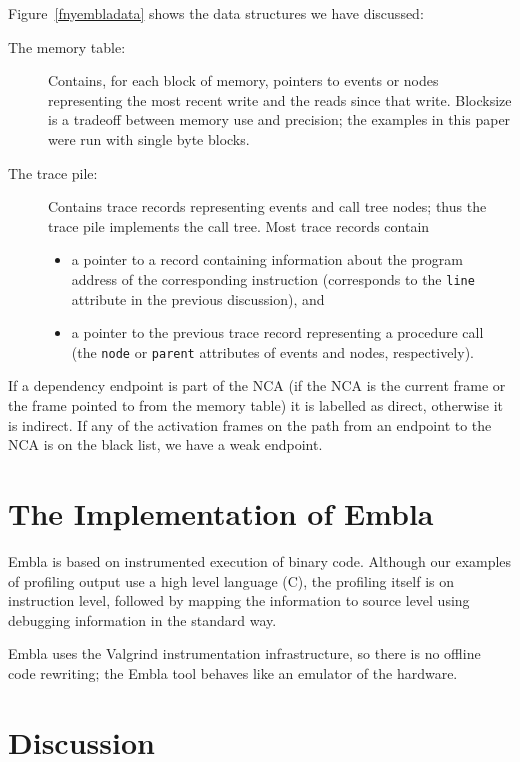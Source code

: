 \documentclass{acm_proc_article-sp}
\begin{document}
Figure~\ref{fnyembladata} shows the data structures we have discussed:
\begin{description}
\item[The memory table:]
Contains, for each block of memory, pointers to events or nodes representing
the most recent write and the reads since that write. 
Blocksize is a tradeoff between memory use and precision; the examples in 
this paper were run with single byte blocks. 
\item[The trace pile:]
Contains trace records representing events and call tree nodes; thus the 
trace pile implements the call tree. Most trace records contain 
\begin{itemize}
\item
a pointer to a record containing information about the program 
address of the corresponding instruction (corresponds to the {\tt line} 
attribute in the previous discussion), and
\item
a pointer to the previous trace record representing a procedure call (the 
{\tt node} or {\tt parent} attributes of events and nodes, respectively).
\end{itemize}
\end{description}

If a dependency endpoint is part of the NCA (if the NCA is the current
frame or the frame pointed to from the memory table) it is labelled as
direct, otherwise it is indirect. If any of the activation frames on
the path from an endpoint to the NCA is on the black list, we have a
weak endpoint.




\section{The Implementation of Embla}

Embla is based on instrumented execution of binary code. Although
our examples of profiling output use a high level language (C),
the profiling itself is on instruction level, followed by 
mapping the information to source level using debugging information 
in the standard way.

Embla uses the Valgrind instrumentation infrastructure, so there
is no offline code rewriting; the Embla tool behaves like an emulator
of the hardware.


\section{Discussion}
\end{document}
